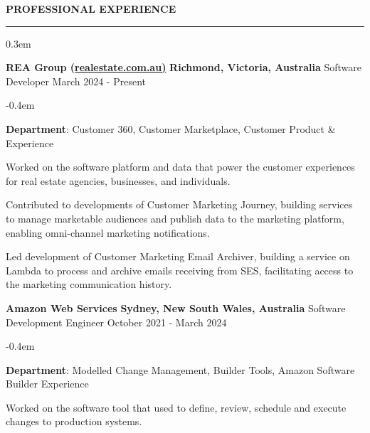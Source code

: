 \documentclass{cv}
\begin{document}
\medskip


 \textbf{PROFESSIONAL EXPERIENCE}
\sectionlineskip
\hrule
\begin{list}{}{\setlength{\leftmargin}{0em}}
\itemsep 0.3em
\item[] 
    \textbf{REA Group (\href{https://realestate.com.au/}{realestate.com.au)}} \hfill \textbf{Richmond, Victoria, Australia}%
    \vspace{0.1em} \newline 
    {Software Developer} \hfill {March 2024 - Present}%
    \begin{list}{\raisebox{0.2em}{\tiny$\bullet$}}{\leftmargin=1.0em}
    \itemsep -0.4em \vspace{-0.4em}
        \item \textbf{Department}: Customer 360, Customer Marketplace, Customer Product \& Experience
        \item Worked on the software platform and data that power the customer experiences for real estate agencies, businesses, and individuals.
        \item Contributed to developments of Customer Marketing Journey, building services to manage marketable audiences and publish data to the marketing platform, enabling omni-channel marketing notifications.
        \item Led development of Customer Marketing Email Archiver, building a service on Lambda to process and archive emails receiving from SES, facilitating access to the marketing communication history.
    \end{list}
\item[] 
    \textbf{Amazon Web Services} \hfill \textbf{Sydney, New South Wales, Australia}%
    \vspace{0.1em} \newline 
    {Software Development Engineer} \hfill {October 2021 - March 2024}%
    \begin{list}{\raisebox{0.2em}{\tiny$\bullet$}}{\leftmargin=1.0em}
    \itemsep -0.4em \vspace{-0.4em}
        \item \textbf{Department}: Modelled Change Management, Builder Tools, Amazon Software Builder Experience
        \item Worked on the software tool that used to define, review, schedule and execute changes to production systems.

\end{list}
\end{list}
\end{document}
